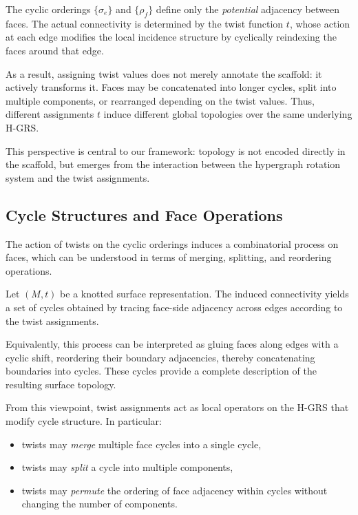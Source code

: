 \documentclass[acmtog,anonymous,review]{acmart}
\begin{document}
The cyclic orderings $\{\sigma_e\}$ and $\{\rho_f\}$ define only the
\emph{potential} adjacency between faces. The actual connectivity is
determined by the twist function $t$, whose action at each edge modifies
the local incidence structure by cyclically reindexing the faces around
that edge.

As a result, assigning twist values does not merely annotate the scaffold: it actively transforms it. Faces may be concatenated into longer cycles,
split into multiple components, or rearranged depending on the twist
values. Thus, different assignments $t$ induce different global
topologies over the same underlying H-GRS.

This perspective is central to our framework: topology is not encoded
directly in the scaffold, but emerges from the interaction between the
hypergraph rotation system and the twist assignments.



\subsection{Cycle Structures and Face Operations}

The action of twists on the cyclic orderings induces a combinatorial
process on faces, which can be understood in terms of merging, splitting,
and reordering operations.

\begin{definition}
Let $(M, t)$ be a knotted surface representation. The induced connectivity yields a set of cycles obtained by tracing face-side adjacency across edges according to the twist assignments.
\end{definition}

Equivalently, this process can be interpreted as gluing faces along edges with a cyclic shift, reordering their boundary adjacencies, thereby concatenating boundaries into cycles. These cycles provide a complete description of
the resulting surface topology.

From this viewpoint, twist assignments act as local operators on the
H-GRS that modify cycle structure. In particular:
\begin{itemize}
    \item twists may \emph{merge} multiple face cycles into a single cycle,
    \item twists may \emph{split} a cycle into multiple components,
    \item twists may \emph{permute} the ordering of face adjacency within cycles without changing the
    number of components.
\end{itemize}
\end{document}
